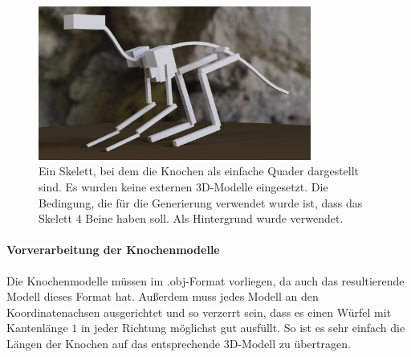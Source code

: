 \begin{figure}
 \centering
 \includegraphics[width=0.8\textwidth]{../java_skeleton_generation/example_skeletons/4legs_boxes.jpg}
 \caption{Ein Skelett, bei dem die Knochen als einfache Quader dargestellt sind. Es wurden keine externen 3D-Modelle eingesetzt. Die Bedingung, die für die Generierung verwendet wurde ist, dass das Skelett $4$ Beine haben soll. Als Hintergrund wurde \cite{background} verwendet.}
 \label{4legs_boxes}
\end{figure}


\paragraph{Vorverarbeitung der Knochenmodelle}

Die Knochenmodelle müssen im .obj-Format vorliegen, da auch das resultierende Modell dieses Format hat. Außerdem muss jedes Modell an den Koordinatenachsen ausgerichtet und so verzerrt sein, dass es einen Würfel mit Kantenlänge $1$ in jeder Richtung möglichst gut ausfüllt. So ist es sehr einfach die Längen der Knochen auf das entsprechende 3D-Modell zu übertragen.

